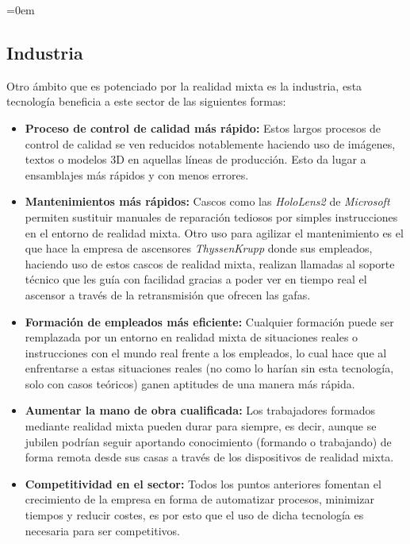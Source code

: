 \parindent=0em
\subsection{Industria}
\noindent



Otro ámbito que es potenciado por la realidad mixta es la industria, esta tecnología beneficia a este sector de las siguientes formas:

\begin{itemize}
    \item \textbf{Proceso de control de calidad más rápido:} Estos largos procesos de control de calidad se ven reducidos notablemente haciendo uso de imágenes, textos o modelos 3D en aquellas líneas de producción. Esto da lugar a ensamblajes más rápidos y con menos errores.
    
     \item \textbf{Mantenimientos más rápidos:} Cascos como las \textit{HoloLens2} de \textit{Microsoft} permiten sustituir manuales de reparación tediosos por simples instrucciones en el entorno de realidad mixta. Otro uso para agilizar el mantenimiento es el que hace la empresa de ascensores \textit{ThyssenKrupp} donde sus empleados, haciendo uso de estos cascos de realidad mixta, realizan llamadas al soporte técnico que les guía con facilidad gracias a poder ver en tiempo real el ascensor a través de la retransmisión que ofrecen las gafas.
     
     \item \textbf{Formación de empleados más eficiente:} Cualquier formación puede ser remplazada por un entorno en realidad mixta de situaciones reales o instrucciones con el mundo real frente a los empleados, lo cual hace que al enfrentarse a estas situaciones reales (no como lo harían sin esta tecnología, solo con casos teóricos) ganen aptitudes de una manera más rápida.
     
     \item \textbf{Aumentar la mano de obra cualificada:} Los trabajadores formados mediante realidad mixta pueden durar para siempre, es decir, aunque se jubilen podrían seguir aportando conocimiento (formando o trabajando) de forma remota desde sus casas a través de los dispositivos de realidad mixta.
     
    \item \textbf{Competitividad en el sector:} Todos los puntos anteriores fomentan el crecimiento de la empresa en forma de automatizar procesos, minimizar tiempos y reducir costes, es por esto que el uso de dicha tecnología es necesaria para ser competitivos.
\end{itemize}

